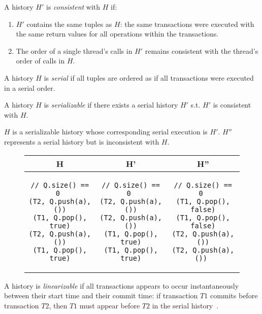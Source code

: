 \begin{defn}
    A history $H'$ is \emph{consistent} with $H$ if:
    \begin{enumerate}
        \item $H'$ contains the same tuples as $H$: the same transactions were executed with the same return values for all operations within the transactions.
        \item The order of a single thread's calls in $H'$ remains consistent with the thread's order of calls in $H$.
    \end{enumerate}
\end{defn}

\begin{defn}
    A history $H$ is \emph{serial} if all tuples are ordered as if all transactions were executed in a serial order.
\end{defn}
\begin{defn}
    A history $H$ is \emph{serializable} if there exists a serial history $H'$ s.t. $H'$ is consistent with $H$.

\end{defn}

\begin{eg}
$H$ is a serializable history whose corresponding serial execution is $H'$. $H''$ represents a serial history but is inconsistent with $H$.
\begin{figure}[H]
\singlespacing   
   \begin{tabular}{c|c|c}
H & H' & H''\\
\hline
\begin{lstlisting}
// Q.size() == 0 
(T2, Q.push(a), ())
(T1, Q.pop(), true)
(T2, Q.push(a), ())
(T1, Q.pop(), true)
\end{lstlisting} & 
\begin{lstlisting}
// Q.size() == 0 
(T2, Q.push(a), ())
(T2, Q.push(a), ())
(T1, Q.pop(), true)
(T1, Q.pop(), true)
\end{lstlisting} &
\begin{lstlisting}
// Q.size() == 0 
(T1, Q.pop(), false)
(T1, Q.pop(), false)
(T2, Q.push(a), ())
(T2, Q.push(a), ()) 
\end{lstlisting}
\end{tabular}
\end{figure}
\end{eg}

\begin{defn}
A history is \emph{linearizable} if all transactions appears to occur instantaneously between their start time and their commit time: if transaction $T1$ commits before transaction $T2$, then $T1$ must appear before $T2$ in the serial history~\cite{harristm}.
\end{defn}

